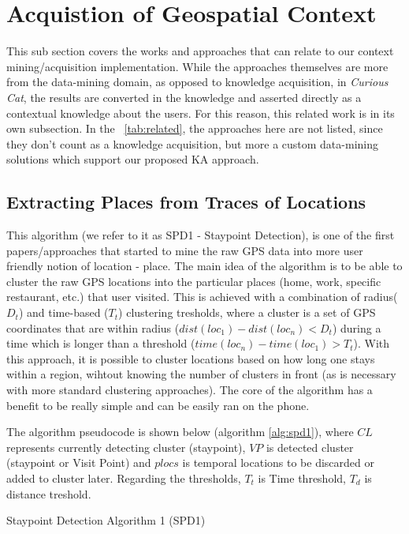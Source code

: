\section{Acquistion of Geospatial Context}
This sub section covers the works and approaches that can relate to our 
context mining/acquisition implementation. While the approaches themselves are
more from the data-mining domain, as opposed to knowledge acquisition, in
\emph{Curious Cat}, the results are converted in the knowledge and asserted 
directly as a contextual knowledge about the users. For this reason, this
related work is in its own subsection. In the \tablename~\ref{tab:related}, the 
approaches here are not listed, since they don't count as a knowledge
acquisition, but more a custom data-mining solutions which support our
proposed KA approach.

\subsection{Extracting Places from Traces of Locations}
\label{section:SPD1}
This algorithm (we refer to it as SPD1 - Staypoint Detection), is one of the 
first papers/approaches that started to mine the raw GPS data
into more user friendly notion of location - place.\parencite{Kang2005} The main
idea of the algorithm is to be able to cluster the raw GPS locations into the
particular places (home, work, specific restaurant, etc.) that user visited. 
This is achieved with a combination of radius($D_t$) and time-based ($T_t$) 
clustering tresholds, where a cluster is a set of GPS coordinates that are 
within radius ($dist(loc_1) - dist(loc_n) < D_t$) during a time which is longer 
than a threshold ($time(loc_n)-time(loc_1) > T_t$). With this approach, it is
possible to cluster locations based on how long one stays within a region, 
wihtout knowing the number of clusters in front (as is necessary with more
standard clustering approaches). The core of the algorithm has a benefit
to be really simple and can be easily ran on the phone.

The algorithm pseudocode is shown below (algorithm \ref{alg:spd1}), where $CL$ 
represents currently 
detecting cluster (staypoint), $VP$ is detected cluster (staypoint or Visit 
Point) and $plocs$ is temporal locations to be discarded or added to cluster
later. Regarding the thresholds, $T_t$ is Time threshold, $T_d$ is distance 
treshold.

\begin{algorithm}[htb]
\caption{Staypoint Detection Algorithm 1 (SPD1)}
\label{alg:spd1}

\vspace{5pt}
\vspace{5pt}
{
}
\end{algorithm}

